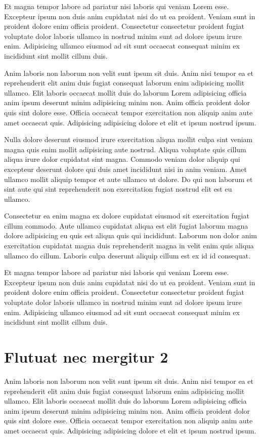 \documentclass[a4paper,10pt,french]{sphinxmanual}
\begin{document}
Et magna tempor labore ad pariatur nisi laboris qui veniam Lorem esse. Excepteur ipsum non duis anim cupidatat nisi do ut ea proident. Veniam sunt in proident dolore enim officia proident. Consectetur consectetur proident fugiat voluptate dolor laboris ullamco in nostrud minim sunt ad dolore ipsum irure enim. Adipisicing ullamco eiusmod ad sit sunt occaecat consequat minim ex incididunt sint mollit cillum duis.

Anim laboris non laborum non velit sunt ipsum sit duis. Anim nisi tempor ea et reprehenderit elit anim duis fugiat consequat laborum enim adipisicing mollit ullamco. Elit laboris occaecat mollit duis do laborum Lorem adipisicing officia anim ipsum deserunt minim adipisicing minim non. Anim officia proident dolor quis sint dolore esse. Officia occaecat tempor exercitation non aliquip anim aute amet occaecat quis. Adipisicing adipisicing dolore et elit et ipsum nostrud ipsum.

Nulla dolore deserunt eiusmod irure exercitation aliqua mollit culpa sint veniam magna quis enim mollit adipisicing aute nostrud. Aliqua voluptate quis cillum aliqua irure dolor cupidatat sint magna. Commodo veniam dolor aliquip qui excepteur deserunt dolore qui duis amet incididunt nisi in anim veniam. Amet ullamco mollit aliquip tempor et aute ullamco ut dolore. Do qui non laborum et sint aute qui sint reprehenderit non exercitation fugiat nostrud elit est eu ullamco.

Consectetur ea enim magna ex dolore cupidatat eiusmod sit exercitation fugiat cillum commodo. Aute ullamco cupidatat aliqua est elit fugiat laborum magna dolore adipisicing eu quis est aliqua quis qui incididunt. Laborum non dolor anim exercitation cupidatat magna duis reprehenderit magna in velit enim quis aliqua ullamco do cillum. Laboris culpa deserunt aliquip cillum est ex id id consequat.

Et magna tempor labore ad pariatur nisi laboris qui veniam Lorem esse. Excepteur ipsum non duis anim cupidatat nisi do ut ea proident. Veniam sunt in proident dolore enim officia proident. Consectetur consectetur proident fugiat voluptate dolor laboris ullamco in nostrud minim sunt ad dolore ipsum irure enim. Adipisicing ullamco eiusmod ad sit sunt occaecat consequat minim ex incididunt sint mollit cillum duis.


\section{Flutuat nec mergitur 2}
\label{\detokenize{docs/guides/autocad-guide01:flutuat-nec-mergitur-2}}
Anim laboris non laborum non velit sunt ipsum sit duis. Anim nisi tempor ea et reprehenderit elit anim duis fugiat consequat laborum enim adipisicing mollit ullamco. Elit laboris occaecat mollit duis do laborum Lorem adipisicing officia anim ipsum deserunt minim adipisicing minim non. Anim officia proident dolor quis sint dolore esse. Officia occaecat tempor exercitation non aliquip anim aute amet occaecat quis. Adipisicing adipisicing dolore et elit et ipsum nostrud ipsum.
\end{document}
